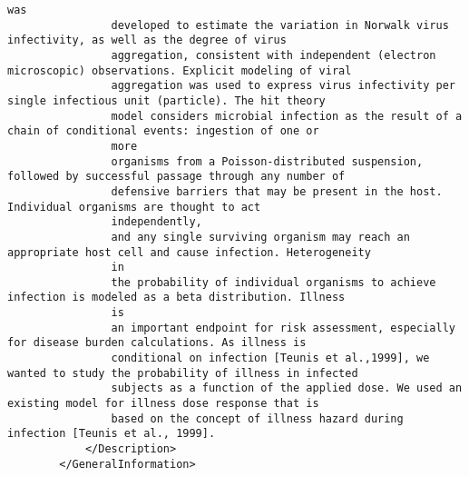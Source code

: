\begin{lstlisting}[language=RAKIP, caption={Example of DoseResponseModel}]
                was
                developed to estimate the variation in Norwalk virus infectivity, as well as the degree of virus
                aggregation, consistent with independent (electron microscopic) observations. Explicit modeling of viral
                aggregation was used to express virus infectivity per single infectious unit (particle). The hit theory
                model considers microbial infection as the result of a chain of conditional events: ingestion of one or
                more
                organisms from a Poisson-distributed suspension, followed by successful passage through any number of
                defensive barriers that may be present in the host. Individual organisms are thought to act
                independently,
                and any single surviving organism may reach an appropriate host cell and cause infection. Heterogeneity
                in
                the probability of individual organisms to achieve infection is modeled as a beta distribution. Illness
                is
                an important endpoint for risk assessment, especially for disease burden calculations. As illness is
                conditional on infection [Teunis et al.,1999], we wanted to study the probability of illness in infected
                subjects as a function of the applied dose. We used an existing model for illness dose response that is
                based on the concept of illness hazard during infection [Teunis et al., 1999].
            </Description>
        </GeneralInformation>


\end{lstlisting}
